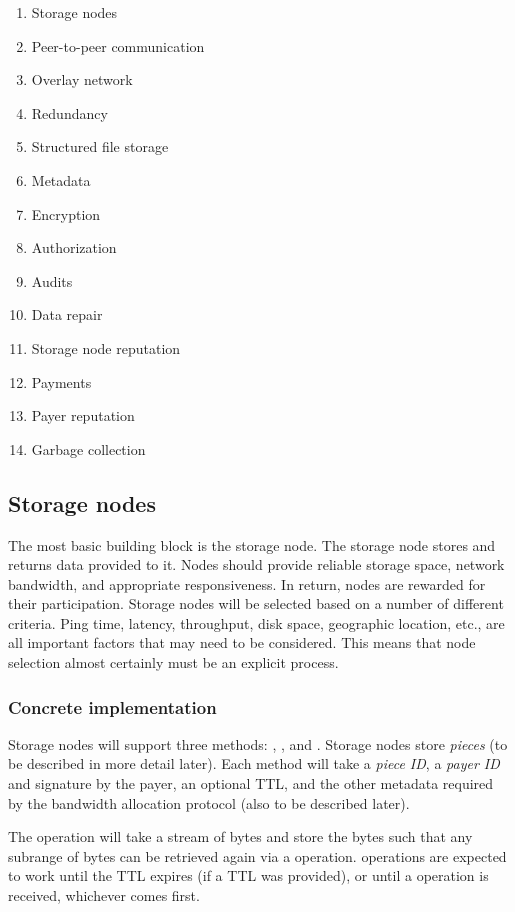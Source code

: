 \documentclass[a4paper,10pt]{article} \usepackage[utf8]{inputenc}
\begin{document}
\begin{enumerate}
\item Storage nodes
\item Peer-to-peer communication
\item Overlay network
\item Redundancy
\item Structured file storage
\item Metadata
\item Encryption
\item Authorization
\item Audits
\item Data repair
\item Storage node reputation
\item Payments
\item Payer reputation
\item Garbage collection
\end{enumerate}

\subsection{Storage nodes}

The most basic building block is the storage node. The storage node stores and
returns data provided to it. Nodes should provide reliable storage space,
network bandwidth, and appropriate responsiveness. In return, nodes are rewarded
for their participation. Storage nodes will be selected based on a number of
different criteria. Ping time, latency, throughput, disk space, geographic
location, etc., are all important factors that may need to
be considered. This means that node selection almost certainly must be an
explicit process.

\subsubsection{Concrete implementation}

Storage nodes will support three methods: , , and
. Storage nodes store {\em pieces} (to be described in more detail
later). Each method will take a {\em piece ID}, a {\em payer ID} and signature
by the payer, an optional TTL, and the other metadata required by the bandwidth
allocation protocol (also to be described later).

The  operation will take a stream of bytes and store the bytes such
that any subrange of bytes can be retrieved again via a  operation.
 operations are expected to work until the TTL expires (if a TTL was
provided), or until a  operation is received, whichever comes
first.
\end{document}
